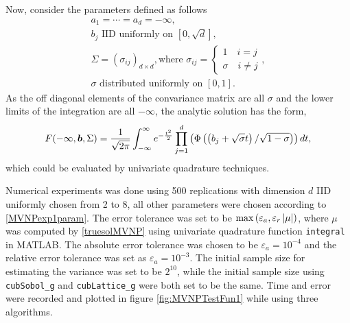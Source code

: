 \documentclass{iitthesis}
\theoremstyle{definition}
\begin{document}
Now, consider the parameters defined as follows 
\begin{subequations} \label{MVNPexp1param}
\begin{gather}
a_1=\cdots=a_d =-\infty,\\
b_j \text{ IID uniformly on } [0,\sqrt{d}],\\
\Sigma = (\sigma_{ij})_{d\times d}, \text{where } \sigma_{ij} =  
  \begin{cases}1 \quad i=j \\
   \sigma \quad i \neq j 
  \end{cases},\\
\sigma \text{ distributed uniformly on } [0,1].
\end{gather}
\end{subequations}
As the off diagonal elements of the convariance matrix are all $\sigma$ and the lower limits of the integration are all $-\infty$, the analytic solution has the form,
\begin{align}\label{truesolMVNP}
F(-\infty, \boldsymbol{b},\Sigma) = \frac{1}{\sqrt{2\pi}}\int_{-\infty}^{\infty} e^{-\frac{t^2}{2}} \prod_{j=1}^d \left(\Phi\left(\left(b_j+\sqrt{\sigma}t\right)/\sqrt{1-\sigma}\right)\right)dt,
\end{align}
which could be evaluated by univariate quadrature techniques.

Numerical experiments was done using 500 replications with dimension $d$ IID uniformly chosen from 2 to 8, all other parameters were chosen according to \eqref{MVNPexp1param}. The error tolerance was set to be $\max\left(\varepsilon_a,\varepsilon_r \left \lvert \mu \right \rvert\right)$, where $\mu$ was computed by \eqref{truesolMVNP} using univariate quadrature function {\tt integral} in MATLAB. The absolute error tolerance was chosen to be $\varepsilon_a = 10^{-4}$ and the relative error tolerance was set as $\varepsilon_a = 10^{-3}$. The initial sample size for estimating the variance was set to be $2^10$, while the initial sample size using {\tt cubSobol\_g} and {\tt cubLattice\_g} were both set to be the same. Time and error were recorded and plotted in figure \ref{fig:MVNPTestFun1} while using three algorithms.
\end{document}
